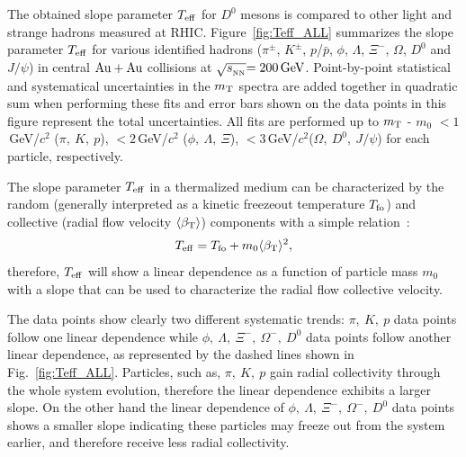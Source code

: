 \documentclass[%
 reprint,	
 amsmath,amssymb,
 aps,
 prc,
]{revtex4-1}
\begin{document}

The obtained slope parameter $T_{\rm eff}$ for $D^0$ mesons is compared to other light and strange hadrons measured at RHIC. %
Figure~\ref{fig:Teff_ALL} summarizes the slope parameter $T_{\rm eff}$ for various identified hadrons ($\pi^{\pm}$, $K^{\pm}$, $p$/$\bar{p}$, $\phi$, $\Lambda$, $\Xi^-$, $\Omega$, $D^0$ and $J/\psi$) in central ${\rm{Au + Au}}$ collisions at $\sqrt{s_{_{\rm NN}}} {\rm = 200\,GeV}$. Point-by-point statistical and systematical uncertainties in the $m_{\rm T}$ spectra are added together in quadratic sum when performing these fits and error bars shown on the data points in this figure represent the total uncertainties. All fits are performed up to $m_{\rm T}$ - $m_{0}$ $<1$\,GeV/$c^2$ ($\pi,\ K,\ p$), $<2$\,GeV/$c^2$ ($\phi,\ \Lambda,\ \Xi$), $<3$\,GeV/$c^2$($\Omega,\ D^{0},\ J/\psi$) for each particle, respectively. 

The slope parameter $T_{\rm eff}$ in a thermalized medium can be characterized by the random (generally interpreted as a kinetic freezeout temperature $T_{\rm fo}$) and collective (radial flow velocity $\langle\beta_{\rm T}\rangle$) components with a simple relation~\cite{StarWhitePaper,Csorgo:1995bi,Kolb:2003dz}:
\begin{equation}
  \begin{aligned}
T_{\rm eff} = T_{\rm fo} + m_0 \langle\beta_{\rm T}\rangle^2,
  \end{aligned}
\label{equ:equation7}
\end{equation}
therefore, $T_{\rm eff}$ will show a linear dependence as a function of particle mass $m_0$ with a slope that can be used to characterize the radial flow collective velocity.

The data points show clearly two different systematic trends: $\pi,\ K,\ p$ data points follow one linear dependence while $\phi,\ \Lambda,\ \Xi^{-},\ \Omega^{-},\ D^0$ data points follow another linear dependence, as represented by the dashed lines shown in Fig.~\ref{fig:Teff_ALL}. Particles, such as, $\pi,\ K,\ p$ gain radial collectivity through the whole system evolution, therefore the linear dependence exhibits a larger slope. On the other hand the linear dependence of $\phi,\ \Lambda,\ \Xi^{-},\ \Omega^{-},\ D^0$ data points shows a smaller slope indicating these particles may freeze out from the system earlier, and therefore receive less radial collectivity.
\end{document}
